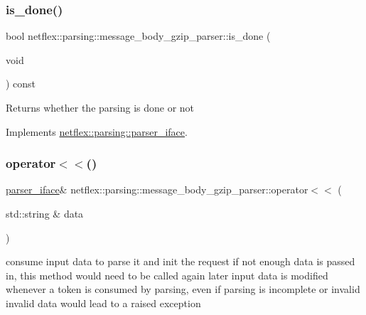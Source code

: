 \subsubsection{\texorpdfstring{is\+\_\+done()}{is\_done()}}
{\footnotesize\ttfamily bool netflex\+::parsing\+::message\+\_\+body\+\_\+gzip\+\_\+parser\+::is\+\_\+done (\begin{DoxyParamCaption}\item[{void}]{ }\end{DoxyParamCaption}) const\hspace{0.3cm}{\ttfamily [virtual]}}

\begin{DoxyReturn}{Returns}
whether the parsing is done or not 
\end{DoxyReturn}


Implements \hyperlink{classnetflex_1_1parsing_1_1parser__iface_afebd1cc50d5958f712dfac0c023fd162}{netflex\+::parsing\+::parser\+\_\+iface}.

\mbox{\label{classnetflex_1_1parsing_1_1message__body__gzip__parser_a5206f23709657035b665238966a5cf13}} 
\subsubsection{\texorpdfstring{operator$<$$<$()}{operator<<()}}
{\footnotesize\ttfamily \hyperlink{classnetflex_1_1parsing_1_1parser__iface}{parser\+\_\+iface}\& netflex\+::parsing\+::message\+\_\+body\+\_\+gzip\+\_\+parser\+::operator$<$$<$ (\begin{DoxyParamCaption}\item[{std\+::string \&}]{data }\end{DoxyParamCaption})\hspace{0.3cm}{\ttfamily [virtual]}}

consume input data to parse it and init the request if not enough data is passed in, this method would need to be called again later input data is modified whenever a token is consumed by parsing, even if parsing is incomplete or invalid invalid data would lead to a raised exception



